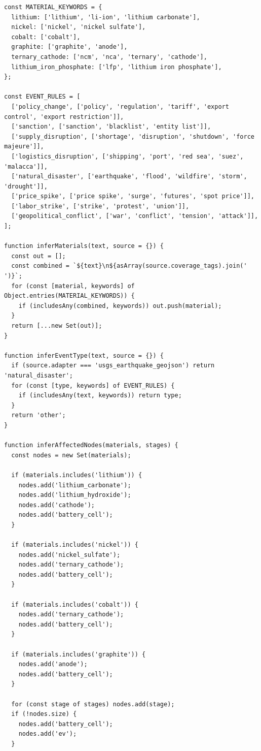 \documentclass[12pt,a4paper]{article}
\begin{document}
\begin{lstlisting}[style=projectcode,caption={多源新闻条目到风险事件的抽取与映射}]
const MATERIAL_KEYWORDS = {
  lithium: ['lithium', 'li-ion', 'lithium carbonate'],
  nickel: ['nickel', 'nickel sulfate'],
  cobalt: ['cobalt'],
  graphite: ['graphite', 'anode'],
  ternary_cathode: ['ncm', 'nca', 'ternary', 'cathode'],
  lithium_iron_phosphate: ['lfp', 'lithium iron phosphate'],
};

const EVENT_RULES = [
  ['policy_change', ['policy', 'regulation', 'tariff', 'export control', 'export restriction']],
  ['sanction', ['sanction', 'blacklist', 'entity list']],
  ['supply_disruption', ['shortage', 'disruption', 'shutdown', 'force majeure']],
  ['logistics_disruption', ['shipping', 'port', 'red sea', 'suez', 'malacca']],
  ['natural_disaster', ['earthquake', 'flood', 'wildfire', 'storm', 'drought']],
  ['price_spike', ['price spike', 'surge', 'futures', 'spot price']],
  ['labor_strike', ['strike', 'protest', 'union']],
  ['geopolitical_conflict', ['war', 'conflict', 'tension', 'attack']],
];

function inferMaterials(text, source = {}) {
  const out = [];
  const combined = `${text}\n${asArray(source.coverage_tags).join(' ')}`;
  for (const [material, keywords] of Object.entries(MATERIAL_KEYWORDS)) {
    if (includesAny(combined, keywords)) out.push(material);
  }
  return [...new Set(out)];
}

function inferEventType(text, source = {}) {
  if (source.adapter === 'usgs_earthquake_geojson') return 'natural_disaster';
  for (const [type, keywords] of EVENT_RULES) {
    if (includesAny(text, keywords)) return type;
  }
  return 'other';
}

function inferAffectedNodes(materials, stages) {
  const nodes = new Set(materials);

  if (materials.includes('lithium')) {
    nodes.add('lithium_carbonate');
    nodes.add('lithium_hydroxide');
    nodes.add('cathode');
    nodes.add('battery_cell');
  }

  if (materials.includes('nickel')) {
    nodes.add('nickel_sulfate');
    nodes.add('ternary_cathode');
    nodes.add('battery_cell');
  }

  if (materials.includes('cobalt')) {
    nodes.add('ternary_cathode');
    nodes.add('battery_cell');
  }

  if (materials.includes('graphite')) {
    nodes.add('anode');
    nodes.add('battery_cell');
  }

  for (const stage of stages) nodes.add(stage);
  if (!nodes.size) {
    nodes.add('battery_cell');
    nodes.add('ev');
  }


\end{lstlisting}
\end{document}
